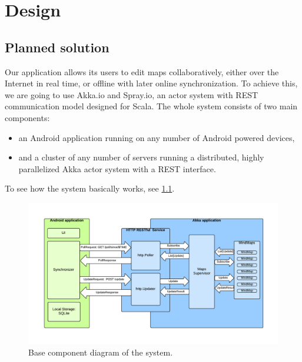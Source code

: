 %
%
%
%
%

\chapter{Design}
\label{chap:project}



\section{Planned solution}
\label{sec:plan}

Our application allows its users to edit maps collaboratively, either over the Internet in real time, or offline with later online synchronization. To achieve this, we are going to use Akka.io and Spray.io, an actor system with REST communication model designed for Scala. The whole system consists of two main components:

\begin{itemize}
	\item an Android application running on any number of Android powered devices,
	\item and a cluster of any number of servers running a distributed, highly parallelized Akka actor system with a REST interface.
\end{itemize}

To see how the system basically works, see \cref{fig:diagram-components-system}.

\begin{figure}[h]
	\centering
	\includegraphics[width=\textwidth]{component-diagram}
	\caption{Base component diagram of the system.}
	\label{fig:diagram-components-system}
\end{figure}





